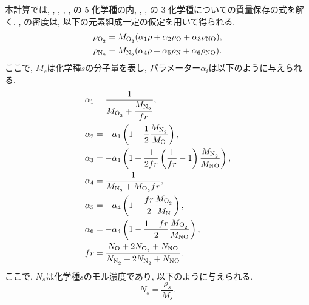 本計算では,
, , , , の 5 化学種の内,
, ,  の 3 化学種についての質量保存の式を解く.
, の密度は,
以下の元素組成一定の仮定を用いて得られる.
\begin{align}
\rho_{\ce{O2}} &= M_{\ce{O2}} (\alpha_1 \rho + \alpha_2 \rho_{\ce{O}} + \alpha_3 \rho_{\ce{NO}} ), \\
\rho_{\ce{N2}} &= M_{\ce{N2}} (\alpha_4 \rho + \alpha_5 \rho_{\ce{N}} + \alpha_6 \rho_{\ce{NO}} ).
\end{align}
ここで,
$M_{s}$は化学種$s$の分子量を表し,
パラメーター$\alpha{_i}$は以下のように与えられる.
\begin{align}
\alpha_{1} &=\dfrac{1}{M_{\ce{O2}}+\dfrac{M_{\ce{N2}}}{fr}},\\
\alpha_{2} &=-\alpha_1 \left( 1+\dfrac{1}{2} \dfrac{M_{\ce{N2}}}{M_{\ce{O}}} \right),\\
\alpha_{3} &=-\alpha_1 \left( 1+\dfrac{1}{2fr} \left( \dfrac{1}{fr} -1 \right) \dfrac{M_{\ce{N2}}}{M_{\ce{NO}}} \right),\\
\alpha_{4} &=\dfrac{1}{M_{\ce{N2}}+M_{\ce{O2}}fr},\\
\alpha_{5} &=-\alpha_4 \left( 1+\dfrac{fr}{2} \dfrac{M_{\ce{O2}}}{M_{\ce{N}}} \right),\\
\alpha_{6} &=-\alpha_4 \left( 1-\dfrac{1-fr}{2} \frac{M_{\ce{O2}}}{M_{\ce{NO}}} \right),\\
fr &=\frac{N_{\ce{O}}+2N_{\ce{O2}}+N_{\ce{NO}}} {N_{\ce{N2}}+2N_{\ce{N2}}+N_{\ce{NO}}}.
\end{align}
ここで,
$N_{s}$は化学種$s$のモル濃度であり,
以下のように与えられる.
\begin{equation}
N_s=\dfrac{\rho_s}{M_s}.
\end{equation}

